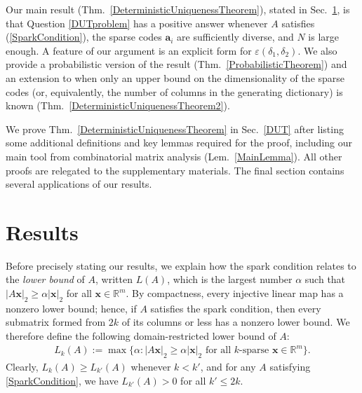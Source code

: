 \documentclass[journal, twocolumn]{IEEEtran}
\begin{document}
Our main result (Thm.~\ref{DeterministicUniquenessTheorem}), stated in Sec.~\ref{Results}, is that Question \ref{DUTproblem} has a positive answer whenever $A$ satisfies (\ref{SparkCondition}), the sparse codes $\mathbf{a}_i$ are sufficiently diverse, and $N$ is large enough.  A feature of our argument is an explicit form for $\varepsilon(\delta_1, \delta_2)$.  We also provide a probabilistic version of the result (Thm.~\ref{ProbabilisticTheorem}) and an extension to when only an upper bound on the dimensionality of the sparse codes (or, equivalently, the number of columns in the generating dictionary) is known (Thm.~\ref{DeterministicUniquenessTheorem2}). 

We prove Thm.~\ref{DeterministicUniquenessTheorem} in Sec.~\ref{DUT} after listing some additional definitions and key lemmas required for the proof, including our main tool from combinatorial matrix analysis (Lem.~\ref{MainLemma}). All other proofs are relegated to the supplementary materials. The final section contains several applications of our results.


\section{Results}\label{Results}

Before precisely stating our results, we explain how the spark condition relates to the \emph{lower bound} \cite{Grcar10} of $A$, written $L(A)$, which is the largest number $\alpha$ such that $|A\mathbf{x}|_2 \geq \alpha|\mathbf{x}|_2$ for all $\mathbf{x} \in \mathbb{R}^m$. By compactness, every injective linear map has a nonzero lower bound; hence, if $A$ satisfies the spark condition, then every submatrix formed from $2k$ of its columns or less has a nonzero lower bound. We therefore define the following domain-restricted lower bound of $A$:
\begin{align*}
L_k(A) := \max \{ \alpha : |A\mathbf{x}|_2 \geq \alpha|\mathbf{x}|_2 \text{ for all $k$-sparse } \mathbf{x} \in \mathbb{R}^m\}.
\end{align*} 
Clearly, $L_k(A) \geq L_{k'}(A)$ whenever $k < k'$, and for any $A$ satisfying \eqref{SparkCondition}, we have $L_{k'}(A) > 0$ for all $k' \leq 2k$. 
\end{document}
